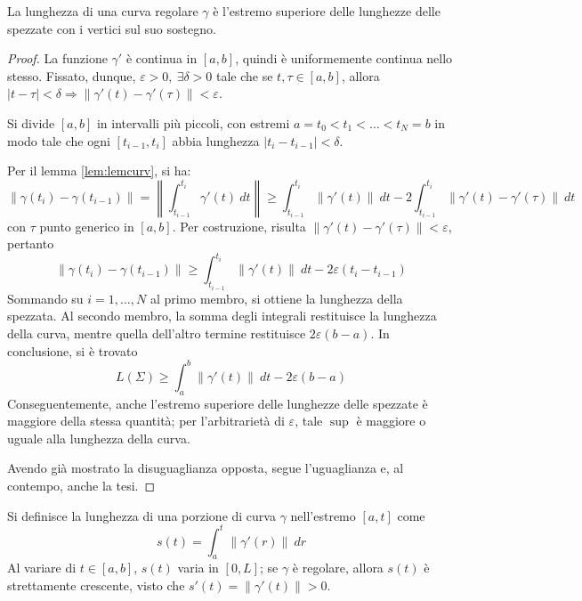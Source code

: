 \documentclass[10pt, a4paper]{scrartcl}
\theoremstyle{definition}
\numberwithin{esempio}{section}
\theoremstyle{definition}
\numberwithin{obs}{section}
\numberwithin{nota}{section}
\numberwithin{equation}{subsection}
\begin{document}
\begin{teorema}
	{}{}
	La lunghezza di una curva regolare $\gamma$ \`e l'estremo superiore delle lunghezze delle spezzate con i vertici sul suo sostegno.
	\begin{proof}
		La funzione $\gamma'$ \`e continua in $\left[ a,b \right] $, quindi \`e uniformemente continua nello stesso.
		Fissato, dunque, $\varepsilon >0, \ \exists \delta >0 $ tale che se $t, \tau \in \left[ a,b \right] $, allora $\lvert t-\tau  \rvert <\delta \Rightarrow \left\lVert \gamma'(t) - \gamma'(\tau )   \right\rVert < \varepsilon $.

		Si divide $\left[ a,b \right] $ in intervalli pi\`u piccoli, con estremi $a = t_0 < t_1 < \ldots < t_N = b$ in modo tale che ogni $\left[ t_{i-1} ,t_i \right] $ abbia lunghezza $\lvert t_i - t_{i-1}  \rvert < \delta $.

		Per il lemma \ref{lem:lemcurv}, si ha:
		\[
		\left\lVert \gamma(t_i) - \gamma(t_{i-1} ) \right\rVert  = \left\lVert \int_{t_{i-1} } ^{t_i} \gamma'(t) \ dt  \right\rVert \ge  \int_{t_{i-1} } ^{t_i} \left\lVert \gamma'(t) \right\rVert  \ dt - 2 \int_{t_{i-1} } ^{t_i} \left\lVert \gamma'(t) - \gamma'(\tau ) \right\rVert \ dt
		\] 
		con $\tau $ punto generico in $\left[ a,b \right] $.
		Per costruzione, risulta $\left\lVert \gamma'(t) - \gamma'( \tau ) \right\rVert < \varepsilon $, pertanto
		\[
		\left\lVert \gamma(t_i) - \gamma(t_{i-1})  \right\rVert \ge  \int_{t_{i-1} } ^{t_i} \left\lVert \gamma' (t) \right\rVert \ dt - 2 \varepsilon  ( t_i - t_{i-1} )
		\] 
	Sommando su $i= 1, \ldots, N$ al primo membro, si ottiene la lunghezza della spezzata.
	Al secondo membro, la somma degli integrali restituisce la lunghezza della curva, mentre quella dell'altro termine restituisce $2\varepsilon  (b-a)$. 
	In conclusione, si \`e trovato
	\[
	L(\Sigma) \ge  \int_{a} ^b \left\lVert \gamma'  (t)\right\rVert \ dt - 2\varepsilon (b-a)
	\] 
	Conseguentemente, anche l'estremo superiore delle lunghezze delle spezzate \`e maggiore della stessa quantit\`a; per l'arbitrariet\`a di $\varepsilon $, tale $\sup$ \`e maggiore o uguale alla lunghezza della curva. 

	Avendo gi\`a mostrato la disuguaglianza opposta, segue l'uguaglianza e, al contempo, anche la tesi.
	\end{proof}
\end{teorema}
Si definisce la lunghezza di una porzione di curva $\gamma$ nell'estremo $\left[ a,t \right] $ come
\[
s(t) = \int_{a} ^t \left\lVert \gamma'(r) \right\rVert \ dr
\] 
Al variare di $t \in \left[ a,b \right] $, $s(t)$ varia in $\left[ 0,L \right] $; se $\gamma$ \`e regolare, allora $s(t)$ \`e strettamente crescente, visto che $ s'(t) = \left\lVert \gamma'(t) \right\rVert > 0$.
\end{document}
